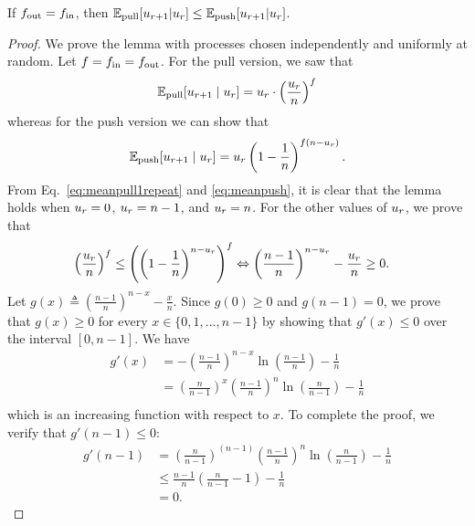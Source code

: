 \begin{lemma}
  \label{lem:pullbetterthanpush}
If $f_\text{out} = f_\text{in}$, then 
    $\mathbb{E}_{\text{pull}}[u_{r+1}|u_{r}] \leq \mathbb{E}_{\text{push}}[u_{r+1}|u_{r}]$.
\end{lemma}

\begin{proof}
We prove the lemma with processes chosen independently and uniformly at random.  Let  $f=f_\text{in}=f_\text{out}$. For the pull version, we saw that
\begin{align}
  \label{eq:meanpull1repeat}
  \mathbb{E}_\text{pull}[u_{r+1} \mid u_{r}]=u_{r}\cdot\left(\frac{u_{r}}{n}\right)^{f}
\end{align}
whereas for the push version we can show that 
  \begin{equation}
    \label{eq:meanpush}
   \mathbb{E}_{\text{push}}[u_{r+1} \mid u_{r}] = u_{r}\left(1 - \frac{1}{n}\right)^{f(n-u_{r})}.
 \end{equation}
 From Eq.~\eqref{eq:meanpull1repeat} and \eqref{eq:meanpush}, it is clear that the lemma holds when $u_{r}=0$, $u_{r}=n-1$, and $u_{r}=n$. For the other values of $u_{r}$, we prove that
 \begin{align}
\label{eq:comp}
      & \left( \frac{u_{r}}{n}\right)^{f} \leq \left( \left(1 - \frac{1}{n}\right)^{n - u_{r}}\right)^{f} 
      \Leftrightarrow \left(\frac{n-1}{n}\right)^{n - u_{r}} - \frac{u_{r}}{n} \geq 0.
 \end{align}
  Let $g(x) \triangleq \left(\frac{n-1}{n}\right)^{n - x} - \frac{x}{n}$. Since $g(0) \geq 0$ and $g(n-1) = 0$, we prove that $g(x) \geq 0$ for every $x \in \{0,1,\dots, n-1\}$ by showing that $g'(x) \leq 0$ over the interval $[0,n-1]$. We have
  \begin{equation}
     \begin{split}
      g'(x) 
        &= - \left( \frac{n-1}{n} \right)^{n-x} \ln \left(\frac{n-1}{n}\right) - \frac{1}{n} \\
        &= \left(\frac{n}{n-1}\right)^x \left( \frac{n-1}{n} \right)^{n} \ln \left(\frac{n}{n-1}\right) - \frac{1}{n} \\
      \end{split}
    \end{equation}
    which is an increasing function with respect to $x$. To complete the proof, we verify that $g'(n-1) \leq 0$:
     \begin{equation}
    \begin{split}
      g'(n-1) & =  \left(\frac{n}{n-1}\right)^{(n-1)} \left( \frac{n-1}{n} \right)^{n} \ln \left(\frac{n}{n-1}\right) - \frac{1}{n} \\
      & \leq \frac{n-1}{n} \left(\frac{n}{n-1} -1\right)  - \frac{1}{n} \\ & = 0.
    \end{split}
  \end{equation}
\end{proof}


